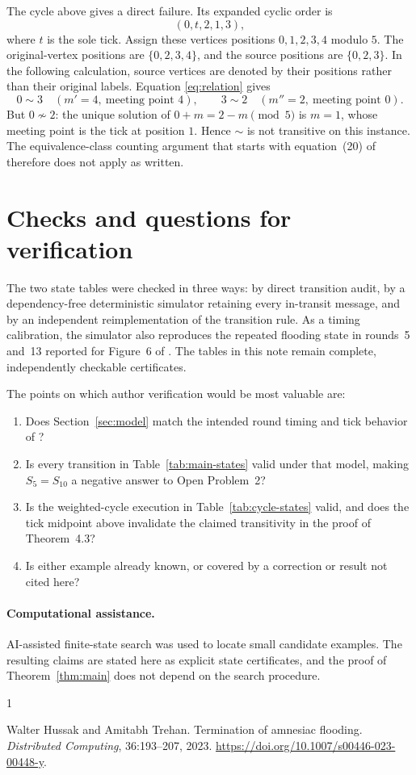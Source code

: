 \documentclass[11pt]{article}
\begin{document}
The cycle above gives a direct failure.  Its expanded cyclic order is
\[
(0,t,2,1,3),
\]
where \(t\) is the sole tick.  Assign these vertices positions
\(0,1,2,3,4\) modulo \(5\).  The original-vertex positions are
\(\{0,2,3,4\}\), and the source positions are \(\{0,2,3\}\).  In the
following calculation, source vertices are denoted by their positions rather
than their original labels.  Equation
\eqref{eq:relation} gives
\[
0\sim3 \quad(m'=4,\ \text{meeting point }4),\qquad
3\sim2 \quad(m''=2,\ \text{meeting point }0).
\]
But \(0\not\sim2\): the unique solution of \(0+m=2-m\pmod 5\) is \(m=1\),
whose meeting point is the tick at position \(1\).  Hence \(\sim\) is not
transitive on this instance.  The equivalence-class counting argument that
starts with equation~(20) of \cite{HT2023} therefore does not apply as
written.

\clearpage
\section{Checks and questions for verification}

The two state tables were checked in three ways: by direct transition audit,
by a dependency-free deterministic simulator retaining every in-transit
message, and by an independent reimplementation of the transition rule.  As
a timing calibration, the simulator also reproduces the repeated flooding
state in rounds~5 and~13 reported for Figure~6 of \cite{HT2023}.  The tables
in this note remain complete, independently checkable certificates.

The points on which author verification would be most valuable are:
\begin{enumerate}
  \item Does Section~\ref{sec:model} match the intended round timing and
        tick behavior of \cite{HT2023}?
  \item Is every transition in Table~\ref{tab:main-states} valid under that
        model, making \(S_5=S_{10}\) a negative answer to Open Problem~2?
  \item Is the weighted-cycle execution in Table~\ref{tab:cycle-states}
        valid, and does the tick midpoint above invalidate the claimed
        transitivity in the proof of Theorem~4.3?
  \item Is either example already known, or covered by a correction or
        result not cited here?
\end{enumerate}

\paragraph{Computational assistance.}
AI-assisted finite-state search was used to locate small candidate examples.
The resulting claims are stated here as explicit state certificates, and the
proof of Theorem~\ref{thm:main} does not depend on the search procedure.

\begin{thebibliography}{1}

Walter Hussak and Amitabh Trehan.
\newblock Termination of amnesiac flooding.
\newblock \emph{Distributed Computing}, 36:193--207, 2023.
\newblock \url{https://doi.org/10.1007/s00446-023-00448-y}.

\end{thebibliography}
\end{document}

